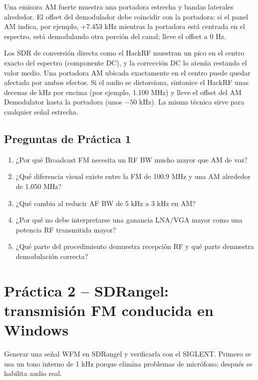 \begin{esperado}
Una emisora AM fuerte muestra una portadora estrecha y bandas laterales alrededor. El offset del demodulador debe coincidir con la portadora: si el panel AM indica, por ejemplo, +7.453 kHz mientras la portadora está centrada en el espectro, está demodulando otra porción del canal; lleve el offset a 0 Hz.
\end{esperado}

\begin{nota}[Componente DC]
Los SDR de conversión directa como el HackRF muestran un pico en el centro exacto del espectro (componente DC), y la corrección DC lo atenúa restando el valor medio. Una portadora AM ubicada exactamente en el centro puede quedar afectada por ambos efectos. Si el audio se distorsiona, sintonice el HackRF unas decenas de kHz por encima (por ejemplo, 1.100 MHz) y lleve el offset del AM Demodulator hasta la portadora (unos $-50$ kHz). La misma técnica sirve para cualquier señal estrecha.
\end{nota}

\subsection{Preguntas de Práctica 1}

\begin{enumerate}
    \item ¿Por qué Broadcast FM necesita un RF BW mucho mayor que AM de voz?
    \item ¿Qué diferencia visual existe entre la FM de 100.9 MHz y una AM alrededor de 1.050 MHz?
    \item ¿Qué cambia al reducir AF BW de 5 kHz a 3 kHz en AM?
    \item ¿Por qué no debe interpretarse una ganancia LNA/VGA mayor como una potencia RF transmitida mayor?
    \item ¿Qué parte del procedimiento demuestra recepción RF y qué parte demuestra demodulación correcta?
\end{enumerate}

\clearpage
\section{Práctica 2 -- SDRangel: transmisión FM conducida en Windows}

\begin{objetivo}
Generar una señal WFM en SDRangel y verificarla con el SIGLENT. Primero se usa un tono interno de 1 kHz porque elimina problemas de micrófono; después se habilita audio real.
\end{objetivo}

